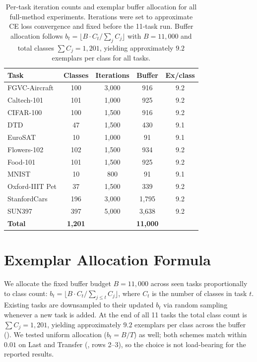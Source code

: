 \documentclass{article}
\begin{document}
  \begin{table}[h]
  \centering
  \caption{Per-task iteration counts and exemplar buffer allocation for all
  full-method experiments. Iterations were set to approximate CE loss
  convergence and fixed before the 11-task run. Buffer allocation follows
  $b_t = \lfloor B \cdot C_t / \sum_{j} C_j \rfloor$ with $B{=}11{,}000$
  and total classes $\sum C_j = 1{,}201$, yielding approximately $9.2$
  exemplars per class for all tasks.}
  \label{tab:iterations}
  \begin{tabular}{lcccc}
  \toprule
  \textbf{Task} & \textbf{Classes} & \textbf{Iterations} & \textbf{Buffer} & \textbf{Ex/class} \\
  \midrule
  FGVC-Aircraft    & 100 & 3{,}000 & 916   & 9.2 \\
  Caltech-101      & 101 & 1{,}000 & 925   & 9.2 \\
  CIFAR-100        & 100 & 1{,}500 & 916   & 9.2 \\
  DTD              &  47 & 1{,}500 & 430   & 9.1 \\
  EuroSAT          &  10 & 1{,}000 &  91   & 9.1 \\
  Flowers-102      & 102 & 1{,}500 & 934   & 9.2 \\
  Food-101         & 101 & 1{,}500 & 925   & 9.2 \\
  MNIST            &  10 &     800 &  91   & 9.1 \\
  Oxford-IIIT Pet  &  37 & 1{,}500 & 339   & 9.2 \\
  StanfordCars     & 196 & 3{,}000 & 1{,}795 & 9.2 \\
  SUN397           & 397 & 5{,}000 & 3{,}638 & 9.2 \\
  \midrule
  \textbf{Total}   & \textbf{1{,}201} & & \textbf{11{,}000} & \\
  \bottomrule
  \end{tabular}
  \end{table}

  \section{Exemplar Allocation Formula}
  \label{app:allocation}

  We allocate the fixed buffer budget $B{=}11{,}000$ across seen tasks
  proportionally to class count: $b_t = \lfloor B \cdot C_t / \sum_{j \le t} C_j
  \rfloor$, where $C_t$ is the number of classes in task $t$. Existing tasks are
  downsampled to their updated $b_t$ via random sampling whenever a new task is
  added. At the end of all 11 tasks the total class count is $\sum C_j = 1{,}201$,
  yielding approximately $9.2$ exemplars per class across the buffer
  (). We tested uniform allocation ($b_t = B/T$) as well;
  both schemes match within $0.01$ on Last and Transfer (,
  rows 2--3), so the choice is not load-bearing for the reported results.


  
\end{document}
